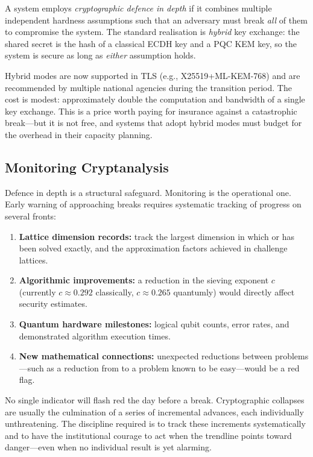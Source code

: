 \begin{definition}
\label{def:defence-depth}
A system employs \emph{cryptographic defence in depth} if it combines multiple independent hardness assumptions such that an adversary must break \emph{all} of them to compromise the system.  The standard realisation is \emph{hybrid} key exchange: the shared secret is the hash of a classical ECDH key and a PQC KEM key, so the system is secure as long as \emph{either} assumption holds.
\end{definition}

Hybrid modes are now supported in TLS (e.g., X25519+ML-KEM-768) and are recommended by multiple national agencies during the transition period.  The cost is modest: approximately double the computation and bandwidth of a single key exchange.  This is a price worth paying for insurance against a catastrophic break---but it is not free, and systems that adopt hybrid modes must budget for the overhead in their capacity planning.

\subsection{Monitoring Cryptanalysis}
\label{subsec:monitoring}

Defence in depth is a structural safeguard.  Monitoring is the operational one.  Early warning of approaching breaks requires systematic tracking of progress on several fronts:
\begin{enumerate}
\item \textbf{Lattice dimension records:} track the largest dimension in which \svp{} or \cvp{} has been solved exactly, and the approximation factors achieved in challenge lattices.
\item \textbf{Algorithmic improvements:} a reduction in the sieving exponent $c$ (currently $c \approx 0.292$ classically, $c \approx 0.265$ quantumly) would directly affect security estimates.
\item \textbf{Quantum hardware milestones:} logical qubit counts, error rates, and demonstrated algorithm execution times.
\item \textbf{New mathematical connections:} unexpected reductions between problems---such as a reduction from \mlwe{} to a problem known to be easy---would be a red flag.
\end{enumerate}

No single indicator will flash red the day before a break.  Cryptographic collapses are usually the culmination of a series of incremental advances, each individually unthreatening.  The discipline required is to track these increments systematically and to have the institutional courage to act when the trendline points toward danger---even when no individual result is yet alarming.


